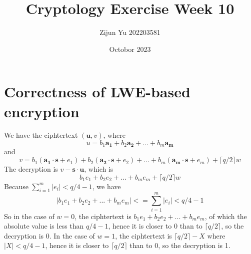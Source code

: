 \documentclass{article}
\title{Cryptology Exercise Week 10}
\author{Zijun Yu 202203581}
\date{Octobor 2023}
\begin{document}
\maketitle

\section*{Correctness of LWE-based encryption}

We have the ciphtertext $(\mathbf{u}, v)$, where
$$u=b_1\mathbf{a_1} + b_2\mathbf{a_2} + ... + b_m\mathbf{a_m}$$
and
$$v=b_1(\mathbf{a_1} \cdot \mathbf{s} + e_1) + b_2(\mathbf{a_2} \cdot \mathbf{s} + e_2) + ... + b_m(\mathbf{a_m} \cdot \mathbf{s} + e_m) + \lceil q/2 \rceil w$$
The decryption is $v - \mathbf{s} \cdot \mathbf{u}$, which is
$$b_1e_1 + b_2e_2 + ... + b_me_m + \lceil q/2 \rceil w$$
Because $\sum_{i=1}^{m}|e_i| < q/4 -1$, we have
$$|b_1e_1 + b_2e_2 + ... + b_me_m| <= \sum_{i=1}^{m}|e_i| < q/4 -1$$
So in the case of $w=0$, the ciphtertext is $b_1e_1 + b_2e_2 + ... + b_me_m$, of which the absolute value is less than $q/4 -1$,
hence it is closer to 0 than to $\lceil q/2 \rceil$, so the decryption is 0. In the case of $w=1$, the ciphtertext is
$\lceil q/2 \rceil - X$ where $|X| < q/4 -1$, hence it is closer to $\lceil q/2 \rceil$ than to 0, so the decryption is 1.
\end{document}

